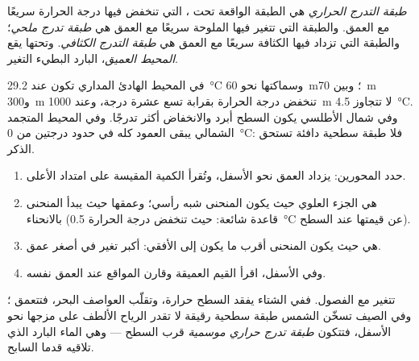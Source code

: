\begin{definition}\label{def:g10:layered-ocean:thermocline}
\emph{طبقة التدرج الحراري} هي الطبقة الواقعة تحت ، التي تنخفض فيها درجة الحرارة سريعًا مع العمق. والطبقة التي تتغير فيها
الملوحة سريعًا مع العمق هي \emph{طبقة تدرج ملحي}؛
والطبقة التي تزداد فيها الكثافة سريعًا مع العمق هي
\emph{طبقة التدرج الكثافي}. وتحتها يقع \emph{المحيط
العميق}، البارد البطيء التغير.
\end{definition}

في المحيط الهادئ المداري تكون  عند \qty{29.2}{\degreeCelsius}
وسماكتها نحو \qty{60}{m}؛ وبين \qty{70}{m} و\qty{300}{m} تنخفض درجة الحرارة
بقرابة تسع عشرة درجة، وعند \qty{1000}{m} لا تتجاوز
\qty{4.5}{\degreeCelsius}. وفي شمال الأطلسي يكون السطح أبرد والانخفاض أكثر تدرجًا.
وفي المحيط المتجمد الشمالي يبقى العمود كله في حدود درجتين من
\qty{0}{\degreeCelsius}: فلا طبقة سطحية دافئة تستحق
الذكر.

\begin{method}\label{met:g10:layered-ocean:profile}
\begin{enumerate}
  \item حدد المحورين: يزداد العمق نحو الأسفل، وتُقرأ الكمية المقيسة على امتداد
        الأعلى.
  \item {} هي الجزء العلوي حيث يكون المنحنى شبه رأسي؛ وعمقها حيث يبدأ
        المنحنى بالانحناء (قاعدة شائعة: حيث تنخفض درجة الحرارة
        \qty{0.5}{\degreeCelsius} عن قيمتها عند السطح).
  \item {} هي حيث يكون المنحنى أقرب ما يكون إلى الأفقي: أكبر
        تغير في أصغر عمق.
  \item وفي الأسفل، اقرأ القيم العميقة وقارن المواقع عند العمق نفسه.
\end{enumerate}
\end{method}

تتغير  مع الفصول. ففي الشتاء يفقد السطح حرارة، وتقلّب العواصف البحر،
فتتعمق ؛ وفي الصيف تسخّن الشمس طبقة سطحية رقيقة لا تقدر الرياح
الألطف على مزجها نحو الأسفل، فتتكون \emph{طبقة تدرج حراري موسمية} قرب السطح ---
وهي الماء البارد الذي تلاقيه قدما السابح.

